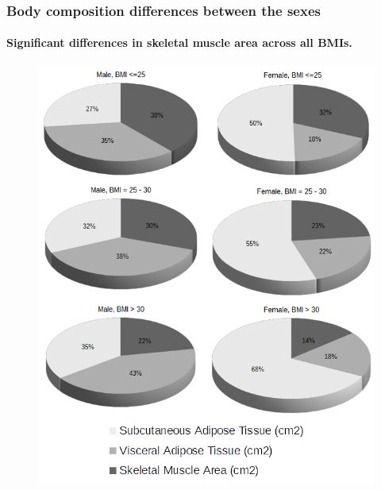\documentclass[10pt]{beamer}
\begin{document}
\begin{frame}
	\frametitle{Body composition differences between the sexes}
	\framesubtitle{Significant differences in skeletal muscle area across all BMIs.}
	\begin{figure}
		\centering
		\includegraphics[height=0.95\textheight]{../Figures/bc_gender_bmi_pie}
		\label{fig:bc_gimp}
	\end{figure}
\end{frame}
\end{document}
